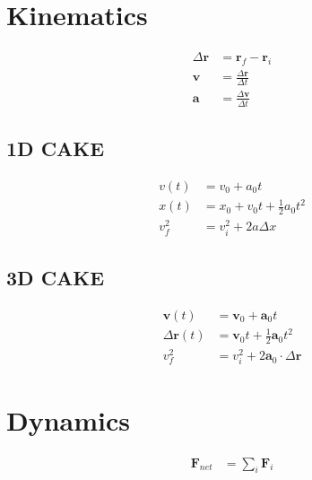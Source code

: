 \documentclass[12pt]{article}
\begin{document}

\pagestyle{empty}
\section{Kinematics}

\begin{align}
\Delta{\bm { r}} &= {\bm r}_f - {\bm r}_i
\\
{\bm v} &= \frac {\Delta \bm r}{\Delta t}
\\
{\bm a} &= \frac {\Delta \bm v}{\Delta t}
\end{align}


\subsection{1D CAKE}

\begin{align}
v(t) &= v_0 + a_0  t
\\
x(t) &=x_0 + v_0t + \frac12 a_0  t^2
\\
v_f^2 &= v_i^2 + 2 a \Delta x 
\end{align}

\subsection{3D CAKE}

\begin{align}
{\bm v}(t) &= {\bm v}_0 + {\bm a}_0  t
\\
{\Delta \bm r}(t) &= {\bm v}_0t + \frac12 {\bm a}_0  t^2
\\
v_f^2 &= v_i^2 + 2 {\bm a}_0 \cdot {\Delta \bm  r}
\end{align}


\section{Dynamics}

\begin{align}
{\bm F}_{net} &= \sum_i {\bm F_i}
\end{align}
\end{document}
